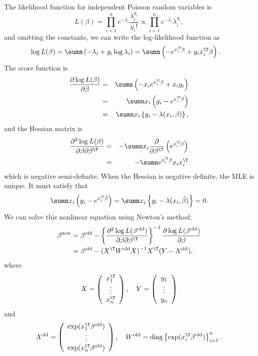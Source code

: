 The likelihood function for independent Poisson random variables is
\[
L(\beta)=\prod_{i=1}^{n}e^{-\lambda_{i}}\frac{\lambda_{i}^{y_{i}}}{y_{i}!}\propto\prod_{i=1}^{n}e^{-\lambda_{i}}\lambda_{i}^{y_{i}},
\]
and omitting the constants, we can write the log-likelihood function
as
\begin{align*}
\log L(\beta) & =\sumn\left(-\lambda_{i}+y_{i}\log\lambda_{i}\right)=\sumn\left(-e^{x_{i}^{\T}\beta}+y_{i}x_{i}^{\T}\beta\right).
\end{align*}
The score function is
\begin{eqnarray*}
\frac{\partial\log L(\beta)}{\partial\beta} 
&=& \sumn\left(-x_{i}e^{x_{i}^{\T}\beta}+x_{i}y_{i}\right) \\
&=& \sumn x_{i}\left(y_{i}-e^{x_{i}^{\T}\beta}\right) \\
&=&\sumn x_{i}\left\{ y_{i}-\lambda(x_{i},\beta)\right\} ,
\end{eqnarray*}
and the Hessian matrix is
\begin{eqnarray*}
\frac{\partial^{2}\log L(\beta)}{\partial\beta\partial\beta^{\T}} 
& = &-\sumn x_{i}\frac{\partial}{\partial\beta^{\T}}\left(e^{x_{i}^{\T}\beta}\right) \\
&=&-\sumn e^{x_{i}^{\T}\beta}x_{i}x_{i}^{\T}
\end{eqnarray*}
which is negative semi-definite. When the Hessian is negative definite,
the MLE is unique. It must satisfy that
\[
\sumn x_{i}\left(y_{i}-e^{x_{i}^{\T}\hat{\beta}}\right)=\sumn x_{i}\left\{ y_{i}-\lambda(x_{i},\hat{\beta})\right\} =0.
\]
We can solve this nonlinear equation using Newton's method:
\begin{align*}
\beta^{\text{new}} & =\beta^{\text{old}}-\left\{ \frac{\partial^{2}\log L(\beta^{\text{old}})}{\partial\beta\partial\beta^{\T}}\right\} ^{-1}\frac{\partial\log L(\beta^{\text{old}})}{\partial\beta}\\
 & =\beta^{\text{old}}-(X^{\T}W^{\text{old}}X)^{-1}X^{\T}(Y-\Lambda^{\text{old}}),
\end{align*}
where 
\[
X=\left(\begin{array}{c}
x_{1}^{\T}\\
\vdots\\
x_{n}^{\T}
\end{array}\right),\quad Y=\left(\begin{array}{c}
y_{1}\\
\vdots\\
y_{n}
\end{array}\right)
\]
and
\[
\Lambda^{\text{old}}=\left(\begin{array}{c}
\exp(x_{1}^{\T}\beta^{\text{old}})\\
\vdots\\
\exp(x_{n}^{\T}\beta^{\text{old}})
\end{array}\right),\quad W^{\text{old}}=\text{diag}\left\{ \exp(x_{i}^{\T}\beta^{\text{old}})\right\} _{i=1}^{n}.
\]
